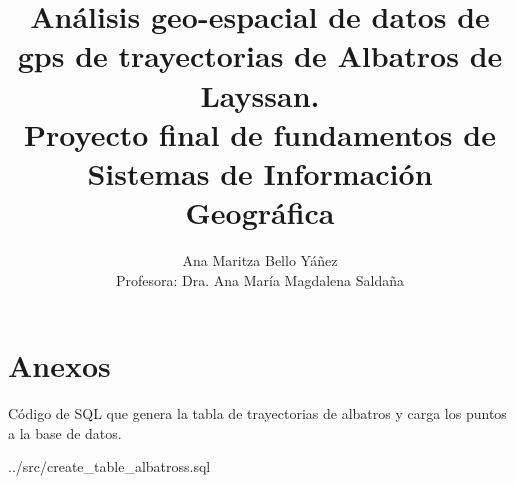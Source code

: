 \documentclass[a4paper, 11pt]{article}
\title{ Análisis geo-espacial de datos de gps de trayectorias de Albatros de
Layssan. \\
Proyecto final de fundamentos de Sistemas de Información Geográfica \\
}
\author{
    Ana Maritza Bello Yáñez \\ 
    Profesora: Dra. Ana María Magdalena Saldaña
    }
\begin{document}
\maketitle
\tableofcontents









\clearpage


\clearpage
% 
%

\pagebreak
\section{Anexos}
Código de SQL que genera la tabla de trayectorias de albatros y carga los puntos
a la base de datos.

 {../src/create_table_albatross.sql}
\end{document}
